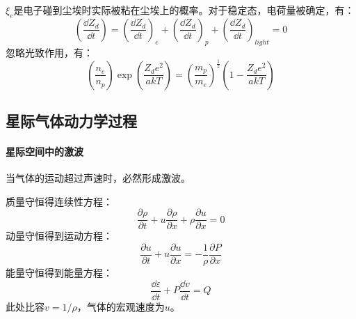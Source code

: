 $\xi_{e}$是电子碰到尘埃时实际被粘在尘埃上的概率。对于稳定态，电荷量被确定，有：
\begin{equation}
	\left(\frac{\dd Z_{d}}{\dd t}\right)=\left(\frac{\dd Z_{d}}{\dd t}\right)_{e}+\left(\frac{\dd Z_{d}}{\dd t}\right)_{p}+\left(\frac{\dd Z_{d}}{\dd t}\right)_{light}=0
\end{equation}
忽略光致作用，有：
\begin{equation}
	\left(\frac{n_{e}}{n_{p}}\right)\exp(\frac{Z_{d}e^2}{akT})=\left(\frac{m_{p}}{m_{e}}\right)^{\frac{1}{2}}\left(1-\frac{Z_{d}e^2}{akT}\right)
\end{equation}
\subsection{星际气体动力学过程}
\paragraph{星际空间中的激波}
当气体的运动超过声速时，必然形成激波。

\noindent 质量守恒得连续性方程：
\begin{equation}
	\frac{\partial \rho}{\partial t}+u\frac{\partial \rho}{\partial x}+\rho\frac{\partial u}{\partial x}=0
\end{equation}
动量守恒得到运动方程：
\begin{equation}
	\frac{\partial u}{\partial t}+u\frac{\partial u}{\partial x}=-\frac{1}{\rho}\frac{\partial P}{\partial x}
\end{equation}
能量守恒得到能量方程：
\begin{equation}
	\frac{\dd \varepsilon}{\dd t}+P\frac{\dd v}{\dd t}=Q
\end{equation}
此处比容$v=1/\rho$，气体的宏观速度为$u$。

